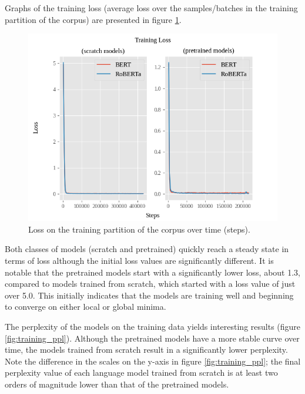 \documentclass[12pt]{article}
\begin{document}
Graphs of the training loss (average loss over the samples/batches in the training partition of the corpus) are presented in figure
\ref{fig:training_loss}.

\begin{figure}[h!]
    \includegraphics[width=\linewidth]{figures/training_loss.png}
    \caption{Loss on the training partition of the corpus over time (steps).}
    \label{fig:training_loss}
\end{figure}

\noindent
Both classes of models (scratch and pretrained) quickly reach a steady state in terms of loss although the initial loss values are significantly
different. It is notable that the pretrained models start with a significantly lower loss, about 1.3, compared to models trained from scratch, which
started with a loss value of just over 5.0. This initially indicates that the models are training well and beginning to converge on either local or
global minima.

The perplexity of the models on the training data yields interesting results (figure \ref{fig:training_ppl}). Although the pretrained models have a
more stable curve over time, the models trained from scratch result in a significantly lower perplexity. Note the difference in the scales on the
y-axis in figure \ref{fig:training_ppl}; the final perplexity value of each language model trained from scratch is at least two orders of magnitude
lower than that of the pretrained models.
\end{document}

